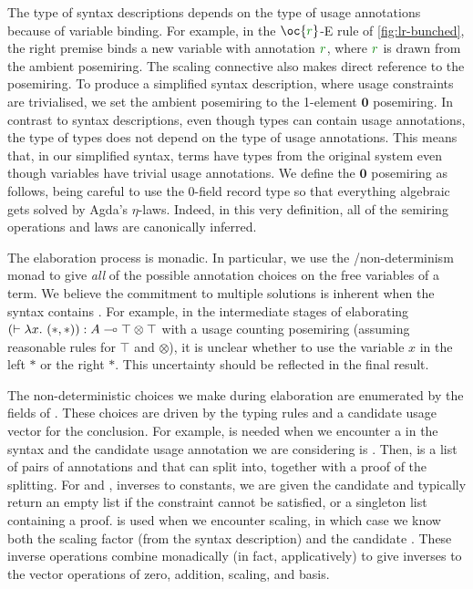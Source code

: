 The type of syntax descriptions depends on the type of usage annotations because
of variable binding.
For example, in the $\oc{\gr r}$-E rule of \cref{fig:lr-bunched}, the right
premise binds a new variable with annotation $\gr r$, where $\gr r$ is drawn
from the ambient posemiring.
The scaling connective also makes direct reference to the posemiring.
To produce a simplified syntax description, where usage constraints are
trivialised, we set the ambient posemiring to the 1-element $\mathbf0$
posemiring.
In contrast to syntax descriptions, even though types can contain usage
annotations, the type of types does not depend on the type of usage annotations.
This means that, in our simplified syntax, terms have types from the original
system even though variables have trivial usage annotations.
We define the $\mathbf0$ posemiring as follows, being careful to use the
0-field record type \AgdaRecord{$\top$} so that everything algebraic gets
solved by Agda's $\eta$-laws.
Indeed, in this very definition, all of the semiring operations and laws are
canonically inferred.


The elaboration process is monadic.
In particular, we use the /non-determinism monad to give
\emph{all} of the possible annotation choices on the free variables of a term.
We believe the commitment to multiple solutions is inherent when the syntax
contains .
For example, in the intermediate stages of elaborating
$\plr{\vdash \lambda x.~\plr{*,*}} : A \multimap \top \otimes \top$ with a
usage counting posemiring (assuming reasonable rules for $\top$ and $\otimes$),
it is unclear whether to use the variable $x$ in the left $*$ or the right $*$.
This uncertainty should be reflected in the final result.

The non-deterministic choices we make during elaboration are enumerated by
the fields of .
These choices are driven by the typing rules and a candidate usage vector for
the conclusion.
For example, \AgdaSpace{} is needed when we
encounter a  in the syntax and the candidate
usage annotation we are considering is .
Then, \AgdaSpace{} is a list of pairs of
annotations  and  that  can split into,
together with a proof of the splitting.
For  and , inverses to constants,
we are given the candidate  and typically return an empty list if
the constraint cannot be satisfied, or a singleton list containing a proof.
 is used when we encounter scaling, in which case we know
both the scaling factor  (from the syntax description) and the
candidate .
These inverse operations combine monadically (in fact, applicatively) to give
inverses to the vector operations of zero, addition, scaling, and basis.

